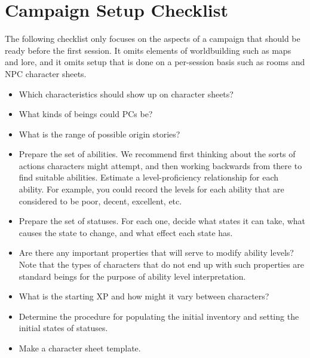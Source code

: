 \section{Campaign Setup Checklist}
The following checklist only focuses on the \peupfudge{} aspects of a campaign that should be ready before the first session.
It omits elements of worldbuilding such as maps and lore,
and it omits setup that is done on a per-session basis such as rooms and NPC character sheets.

\def\itemSquare{\item[$\square{}$]}

\begin{itemize}
\itemSquare
Which characteristics should show up on character sheets?
\itemSquare
What kinds of beings could PCs be?
\itemSquare
What is the range of possible origin stories?
\itemSquare
Prepare the set of abilities.
We recommend first thinking about the sorts of actions characters might attempt, and then working backwards from there to find suitable abilities.
Estimate a level-proficiency relationship for each ability.
For example, you could record the levels for each ability that are considered to be poor, decent, excellent, etc.
\itemSquare
Prepare the set of statuses.
For each one, decide what states it can take, what causes the state to change, and what effect each state has.
\itemSquare
Are there any important properties that will serve to modify ability levels?
Note that the types of characters that do not end up with such properties are standard beings for the purpose of ability level interpretation.
\itemSquare
What is the starting XP and how might it vary between characters?
\itemSquare
Determine the procedure for populating the initial inventory and setting the initial states of statuses.
\itemSquare
Make a character sheet template.
\end{itemize}
